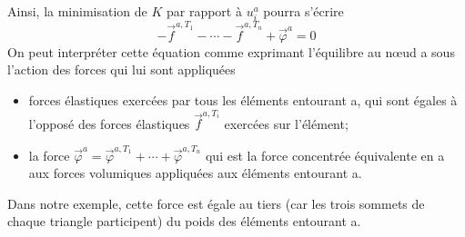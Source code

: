 Ainsi, la minimisation de $K$ par rapport à $u_i^a$ pourra s'écrire
\begin{equation}
    -\vec{f}^{a,T_1} - \cdots - \vec{f}^{a,T_n} + \vec{\varphi}^a = 0
    \label{eq:Ch09-089}
\end{equation}
On peut interpréter cette équation comme exprimant l'équilibre au nœud a sous l'action des forces qui lui sont appliquées
\begin{itemize}
    \item forces élastiques exercées par tous les éléments entourant a, qui sont égales à l'opposé des forces élastiques $\vec{f}^{a,T_i}$ exercées sur l'élément;
    \item la force $\vec{\varphi}^a = \vec{\varphi}^{a,T_1} + \cdots + \vec{\varphi}^{a,T_n}$ qui est la force concentrée équivalente en a aux forces volumiques appliquées aux éléments entourant a.
\end{itemize}
Dans notre exemple, cette force est égale au tiers (car les trois sommets de chaque triangle participent) du poids des éléments entourant a. 

